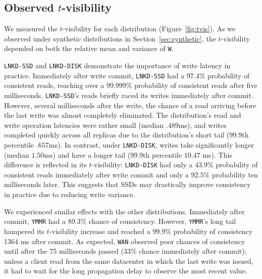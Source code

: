 \documentclass{vldb}
\newcommand{\subsectionskip}{-0em}
\begin{document}
\vspace{3em}

\vspace{\subsectionskip}\subsection{Observed {\large$t$}-visibility}

We measured the $t$-visibility for each distribution
(Figure~\ref{fig:tvis}). As we observed under synthetic distributions
in Section~\ref{sec:synthetic}, the $t$-visibility depended on both
the relative mean and variance of \texttt{W}.

\texttt{LNKD-SSD} and \texttt{LNKD-DISK} demonstrate the importance of
write latency in practice.  Immediately after write commit,
\texttt{LNKD-SSD} had a $97.4\%$ probability of consistent reads,
reaching over a $99.999\%$ probability of consistent reads after five
milliseconds. \texttt{LNKD-SSD}'s reads briefly raced its writes
immediately after commit.  However, several milliseconds after the
write, the chance of a read arriving before the last write was almost
completely eliminated. The distribution's read and write operation
latencies were rather small (median $.489$ms), and writes completed
quickly across all replicas due to the distribution's short tail
($99.9$th percentile $.657$ms).  In contrast, under
\texttt{LNKD-DISK}, writes take significantly longer (median $1.50$ms)
and have a longer tail ($99.9$th percentile $10.47$ ms).  This
difference is reflected in its $t$-visibility: \texttt{LNKD-DISK} had
only a $43.9\%$ probability of consistent reads immediately after
write commit and only a $92.5\%$ probability ten milliseconds later.
This suggests that SSDs may drastically improve consistency in
practice due to reducing write variance.

We experienced similar effects with the other distributions.
Immediately after commit, \texttt{YMMR} had a $89.3\%$ chance of
consistency.  However, \texttt{YMMR}'s long tail hampered its
$t$-visibility increase and reached a $99.9\%$ probability of
consistency 1364 ms after commit.  As expected, \texttt{WAN} observed
poor chances of consistency until after the 75 milliseconds passed
($33\%$ chance immediately after commit); unless a client read from
the same datacenter in which the last write was issued, it had to wait
for the long propagation delay to observe the most recent value.
\end{document}
